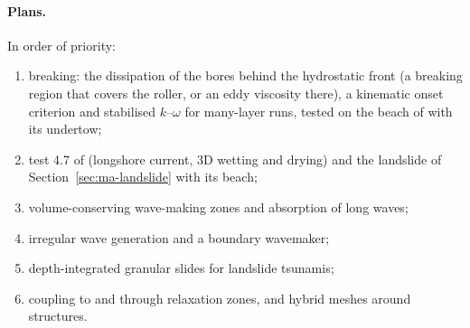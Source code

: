\paragraph{Plans.} In order of priority:
\begin{enumerate}[nosep]
  \item breaking: the dissipation of the bores behind the hydrostatic front
        (a breaking region that covers the roller, or an eddy viscosity there),
        a kinematic onset criterion and stabilised $k$--$\omega$
        \citep{larsen2018} for many-layer runs, tested on the beach of
        \citet{ting1994} with its undertow;
  \item test 4.7 of \citet{ma2012} (longshore current, 3D wetting and
        drying) and the landslide of Section~\ref{sec:ma-landslide} with its
        beach;
  \item volume-conserving wave-making zones and absorption of long waves;
  \item irregular wave generation and a boundary wavemaker;
  \item depth-integrated granular slides for landslide tsunamis;
  \item coupling to  and  through relaxation
        zones, and hybrid meshes around structures.
\end{enumerate}
